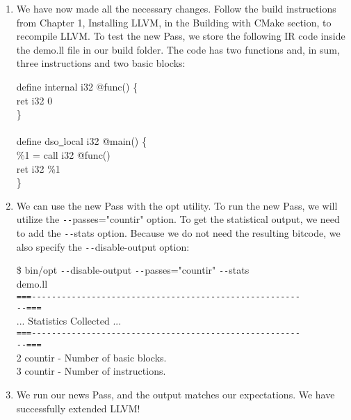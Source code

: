 \begin{enumerate}
	\item We have now made all the necessary changes. Follow the build instructions from Chapter 1, Installing LLVM, in the Building with CMake section, to recompile LLVM. To test the new Pass, we store the following IR code inside the demo.ll file in our build folder. The code has two functions and, in sum, three instructions and two basic blocks:
	\begin{tcolorbox}[colback=white,colframe=black]
		define internal i32 @func() \{ \\
		\hspace*{0.5cm}ret i32 0 \\
		\} \\
		\\
		define dso\underline{~}local i32 @main() \{ \\
		\hspace*{0.5cm}	\%1 = call i32 @func() \\
		\hspace*{0.5cm}	ret i32 \%1 \\
		\}
	\end{tcolorbox}
	
	\item We can use the new Pass with the opt utility. To run the new Pass, we will utilize the \verb|--|passes="countir" option. To get the statistical output, we need to add the \verb|--|stats option. Because we do not need the resulting bitcode, we also specify the \verb|--|disable-output option:
	\begin{tcolorbox}[colback=white,colframe=black]
		\$ bin/opt \verb|--|disable-output \verb|--|passes="countir" \verb|--|stats  \\
		demo.ll \\
		\verb|===------------------------------------------------------| \\
		\verb|--===| \\
		... Statistics Collected ... \\
		\verb|===------------------------------------------------------| \\
		\verb|--===| \\
		2 countir - Number of basic blocks. \\
		3 countir - Number of instructions.
	\end{tcolorbox}
	
	\item We run our news Pass, and the output matches our expectations. We have successfully extended LLVM!
	
\end{enumerate}

